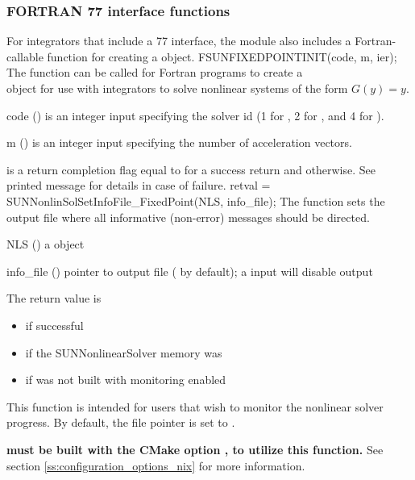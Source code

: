 \subsubsection*{FORTRAN 77 interface functions}
For {\sundials} integrators that include a {\F} 77 interface, the
{\sunnonlinsolfixedpoint} module also includes a Fortran-callable
function for creating a  object.
%
%
{
  FSUNFIXEDPOINTINIT(code, m, ier);
}
{
  The function  can be called for Fortran programs
  to create a\\
   object for use with {\sundials}
  integrators to solve nonlinear systems of the form $G(y) = y$.
}
{
  \begin{args}[code]
  \item[code] ()
    is an integer input specifying the solver id (1 for {\cvode}, 2
    for {\ida}, and 4 for {\arkode}).
  \item[m] ()
    is an integer input specifying the number of acceleration vectors.
  \end{args}
}
{
   is a return completion flag equal to  for a success
  return and  otherwise. See printed message for details in case
  of failure.
}
{}
{
  retval = SUNNonlinSolSetInfoFile\_FixedPoint(NLS, info\_file);
}
{
  The function  sets the
  output file where all informative (non-error) messages should be directed.
}
{
  \begin{args}
  \item[NLS] ()
    a {\sunnonlinsol} object
  \item[info\_file] () pointer to output file ( by default);
    a  input will disable output
  \end{args}
}
{
  The return value is
  \begin{itemize}
    \item {} if successful
    \item {} if the SUNNonlinearSolver memory was 
    \item {} if {\sundials} was not built with monitoring enabled
  \end{itemize}
}
{
  This function is intended for users that wish to monitor the nonlinear
  solver progress. By default, the file pointer is set to .

  \textbf{{\sundials} must be built with the CMake option
  , to utilize this function.}
  See section \ref{ss:configuration_options_nix} for more information.
}

